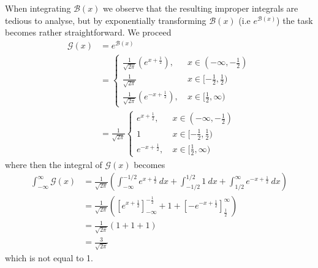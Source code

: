 When integrating $\mathcal{B}(x)$ we observe that the resulting improper integrals are tedious to analyse, but by exponentially transforming $\mathcal{B}(x)$ (i.e $e^{\mathcal{B}(x)}$) the task becomes rather straightforward. We proceed
\begin{align*}
    \mathcal{G}(x) &= e^{\mathcal{B}(x)} \\[5pt]
    &= \begin{cases}
         \frac{1}{\sqrt{2 \pi}} \left( e^{x + \frac{1}{2}} \right), \ &x \in (-\infty, -\frac{1}{2}) \\[5pt]
        \frac{1}{\sqrt{2 \pi}}\ &x \in [-\frac{1}{2}, \frac{1}{2}) \\[5pt]
        \frac{1}{\sqrt{2 \pi}} \left( e^{- x + \frac{1}{2}} \right), \ &x \in [\frac{1}{2}, \infty)
    \end{cases} \\[15pt]
    &=  \frac{1}{\sqrt{2 \pi}} \begin{cases}
         e^{x + \frac{1}{2}} , \ &x \in (-\infty, -\frac{1}{2}) \\[5pt]
        1 \ &x \in [-\frac{1}{2}, \frac{1}{2}) \\[5pt]
         e^{- x + \frac{1}{2}}, \ &x \in [\frac{1}{2}, \infty)
    \end{cases}
\end{align*}
where then the integral of $\mathcal{G}(x)$ becomes 
\begin{align*}
    \int_{-\infty}^{\infty} \mathcal{G}(x) &= \frac{1}{\sqrt{2 \pi}} \left( \int_{-\infty}^{-1/2} e^{x + \frac{1}{2}} \ dx + \int_{-1/2}^{1/2} 1 \ dx + \int_{1/2}^{\infty}  e^{- x + \frac{1}{2}}  \ dx\right) \\[8pt]
    &= \frac{1}{\sqrt{2 \pi}} \left( \left[e^{x + \frac{1}{2}}\right]_{-\infty}^{-\frac{1}{2}} + 1 + \left[- e^{-x + \frac{1}{2}}\right]_{\frac{1}{2}}^{\infty} \right) \\[7pt]
    &= \frac{1}{\sqrt{2 \pi}} \left( 1 + 1 + 1\right) \\[7pt]
    &= \frac{3}{\sqrt{2 \pi}}
\end{align*} 
which is not equal to 1. 


